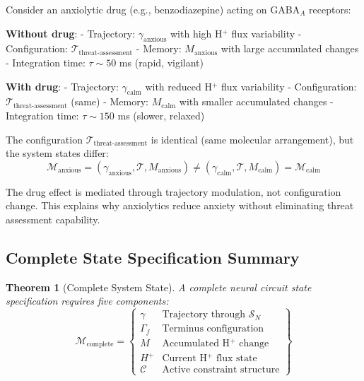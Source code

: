 \documentclass[aps,prd,twocolumn,superscriptaddress,floatfix,nofootinbib]{revtex4-2}
\newtheorem{theorem}{Theorem}[section]
\theoremstyle{remark}
\begin{document}
\begin{example}
\label{ex:anxiolytic}
Consider an anxiolytic drug (e.g., benzodiazepine) acting on GABA$_A$ receptors:

\textbf{Without drug}:
- Trajectory: $\gamma_{\text{anxious}}$ with high H$^+$ flux variability
- Configuration: $\mathcal{T}_{\text{threat-assessment}}$
- Memory: $M_{\text{anxious}}$ with large accumulated changes
- Integration time: $\tau \sim 50$ ms (rapid, vigilant)

\textbf{With drug}:
- Trajectory: $\gamma_{\text{calm}}$ with reduced H$^+$ flux variability
- Configuration: $\mathcal{T}_{\text{threat-assessment}}$ (same)
- Memory: $M_{\text{calm}}$ with smaller accumulated changes
- Integration time: $\tau \sim 150$ ms (slower, relaxed)

The configuration $\mathcal{T}_{\text{threat-assessment}}$ is identical (same molecular arrangement), but the system states differ:
$$
\mathcal{M}_{\text{anxious}} = (\gamma_{\text{anxious}}, \mathcal{T}, M_{\text{anxious}}) \neq (\gamma_{\text{calm}}, \mathcal{T}, M_{\text{calm}}) = \mathcal{M}_{\text{calm}}
$$

The drug effect is mediated through trajectory modulation, not configuration change. This explains why anxiolytics reduce anxiety without eliminating threat assessment capability.
\end{example}

\subsection{Complete State Specification Summary}

\begin{theorem}[Complete System State]
\label{thm:complete_state}
A complete neural circuit state specification requires five components:
\begin{equation}
\mathcal{M}_{\text{complete}} = \left\{
\begin{array}{ll}
\gamma & \text{Trajectory through } \mathcal{S}_N \\
\Gamma_f & \text{Terminus configuration} \\
M & \text{Accumulated H$^+$ change} \\
H^+ & \text{Current H$^+$ flux state} \\
\mathcal{C} & \text{Active constraint structure}
\end{array}
\right\}
\end{equation}
\end{theorem}
\end{document}
